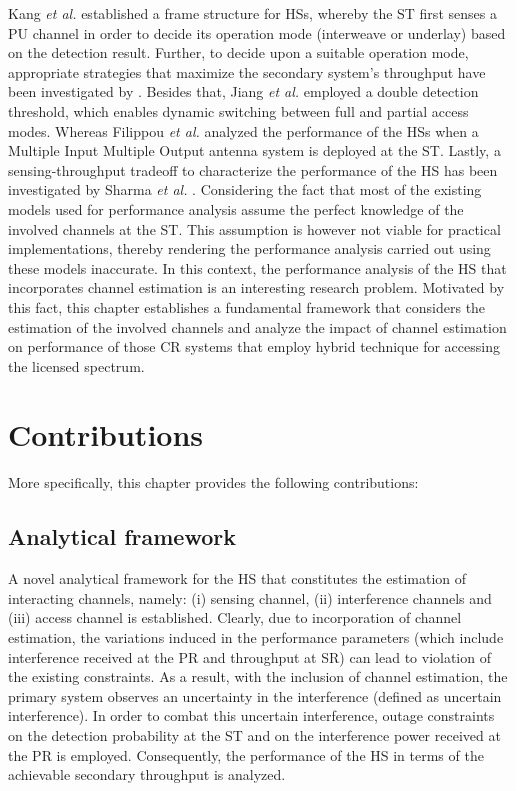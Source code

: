 Kang \textit{et al.} \cite{Kang09} established a frame structure for HSs, whereby the ST first senses a PU channel in order to decide its operation mode (interweave or underlay) based on the detection result. Further, to decide upon a suitable operation mode, appropriate strategies that maximize the secondary system's throughput have been investigated by \cite{Oh10, Senthu12, Song13, Gmira15}. Besides that, Jiang \textit{et al.} employed a double detection threshold, which enables dynamic switching between full and partial access modes. Whereas Filippou \textit{et al.} \cite{Fili15} analyzed the performance of the HSs when a Multiple Input Multiple Output antenna system is deployed at the ST. Lastly, a sensing-throughput tradeoff to characterize the performance of the HS has been investigated by Sharma \textit{et al.} \cite{Sharma14}. 
Considering the fact that most of the existing models \cite{Kang09, Oh10, Senthu12, Song13, Gmira15, Jiang13, Fili15, Sharma14} used for performance analysis assume the perfect knowledge of the involved channels at the ST. This assumption is however not viable for practical implementations, thereby rendering the performance analysis carried out using these models inaccurate. In this context, the performance analysis of the HS that incorporates channel estimation is an interesting research problem. Motivated by this fact, this chapter establishes a fundamental framework that considers the estimation of the involved channels and analyze the impact of channel estimation on performance of those CR systems that employ hybrid technique for accessing the licensed spectrum.
\section{Contributions}
More specifically, this chapter provides the following contributions:

\subsection{Analytical framework}
A novel analytical framework for the HS that constitutes the estimation of interacting channels, namely: (i) sensing channel, (ii) interference channels and (iii) access channel is established. Clearly, due to incorporation of channel estimation, the variations induced in the performance parameters (which include interference received at the PR and throughput at SR) can lead to violation of the existing constraints. As a result, with the inclusion of channel estimation, the primary system observes an uncertainty in the interference (defined as uncertain interference). 
In order to combat this uncertain interference, outage constraints on the detection probability at the ST and on the interference power received at the PR is employed. Consequently, the performance of the HS in terms of the achievable secondary throughput is analyzed.
